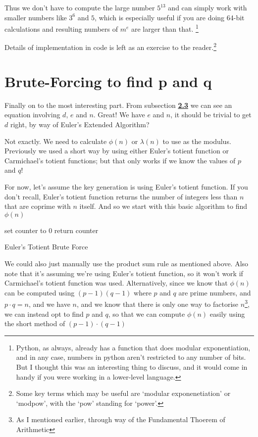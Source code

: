 \documentclass[twocolumn, a4paper,12pt]{article}
\makeatletter
\newcommand{\removelatexerror}{\let\@latex@error\@gobble}
\makeatother
\begin{document}
Thus we don't have to compute the large number $5^{13}$ and can 
simply work with smaller numbers like $3^6$ and $5$, which is especially
useful if you are doing 64-bit calculations and resulting numbers
of $m^e$ are larger than that. \footnote{Python, as always, already has
a function that does modular exponentiation, and in any case, numbers in python
aren't restricted to any number of bits. But I thought this was an interesting
thing to discuss, and it would come in handy if you were working in a lower-level
language.}

Details of implementation in code is left as an exercise to the reader.\footnote{
Some key terms which may be useful are `modular exponenetiation' or `modpow', with the `pow' standing for `power'.
}

\section{Brute-Forcing to find p and q}
Finally on to the most interesting part.
From subsection \hyperlink{subsection.2.3}{\textbf{2.3}} we can
see an equation involving $d$, $e$ and $n$. Great! We have $e$ and
$n$, it should be trivial to get $d$ right, by way of Euler's Extended Algorithm? 


Not exactly. We need to calculate $\phi (n)$ or $\lambda (n)$ to use as the modulus. 
Previously we used a short way by using either Euler's 
totient function or Carmichael's totient
functions; but that only works if we know the values of $p$ and $q$!

For now, let's assume the key generation is using Euler's totient function. If you don't
recall, Euler's totient function returns the number of integers less than $n$ that are coprime
with $n$ itself. And so we start with this basic algorithm to find $\phi (n)$

\begingroup
\removelatexerror%
\begin{algorithm*}[H]
\SetAlgoLined
{}

set counter to 0\;
return counter\;
\caption{Euler's Totient Brute Force}
\end{algorithm*}
\endgroup

We could also just manually use the product sum rule as mentioned above.
Also note that it's assuming we're using Euler's totient function, so it won't 
work if Carmichael's totient function was used.
Alternatively, since we know that $\phi (n)$ can be computed using $(p-1)(q-1)$ where $p$ and $q$ are prime numbers, and $p \cdot q = n$, and we have $n$, and we know that
there is only one way to factorise $n$\footnote{As I mentioned earlier, through way
of the Fundamental Thoerem of Arithmetic}, we can instead opt to find $p$ and $q$, so that
we can compute $\phi (n)$ easily using the short method of $(p-1) \cdot (q-1)$
\end{document}
